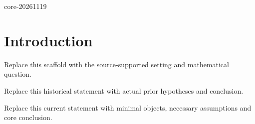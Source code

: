 \def\IntroExpectedRelease{core-20261119}

\ifdefined\IntroRelease
  \edef\IntroActualRelease{\IntroRelease}
  \ifx\IntroActualRelease\IntroExpectedRelease
  \else
    \PackageError{intro-v13}{Release mismatch}{Use the matching release.}
  \fi
\else
  \PackageError{intro-v13}{Missing profile release identity}{Use the matching release.}
\fi

\section{Introduction}
\begin{introparagraph}
Replace this scaffold with the source-supported setting and mathematical question.
\end{introparagraph}
\begin{historical}
Replace this historical statement with actual prior hypotheses and conclusion.
\end{historical}
\begin{resultgroup}
\begin{theorem}
Replace this current statement with minimal objects, necessary assumptions and core conclusion.
\end{theorem}
\end{resultgroup}
